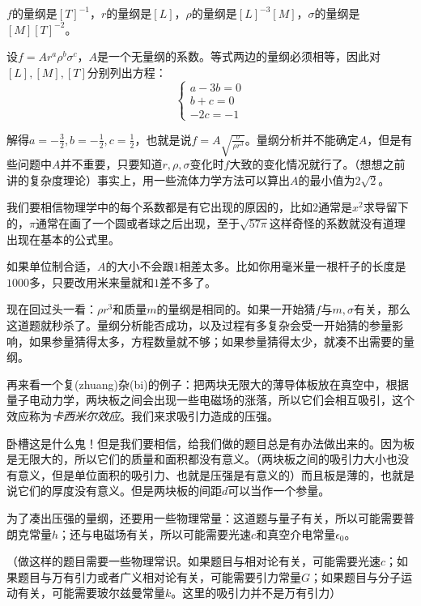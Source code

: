 $f$的量纲是$[T]^{-1}$，$r$的量纲是$[L]$，$\rho$的量纲是$[L]^{-3} [M]$，$\sigma$的量纲是$[M] [T]^{-2}$。

设$f=A r^a \rho^b \sigma^c$，$A$是一个无量纲的系数。等式两边的量纲必须相等，因此对$[L],[M],[T]$分别列出方程：
\begin{equation*}
\begin{cases}
a-3b=0 \\
b+c=0 \\
-2c=-1
\end{cases}
\end{equation*}

解得$a=-\frac{3}{2},b=-\frac{1}{2},c=\frac{1}{2}$，也就是说$f=A \sqrt{\frac{\sigma}{\rho r^3}}$。量纲分析并不能确定$A$，但是有些问题中$A$并不重要，只要知道$r,\rho,\sigma$变化时$f$大致的变化情况就行了。（想想之前讲的复杂度理论）事实上，用一些流体力学方法可以算出$A$的最小值为$2\sqrt{2}$。

我们要相信物理学中的每个系数都是有它出现的原因的，比如$2$通常是$x^2$求导留下的，$\pi$通常在画了一个圆或者球之后出现，至于$\sqrt{57 \pi}$这样奇怪的系数就没有道理出现在基本的公式里。

如果单位制合适，$A$的大小不会跟$1$相差太多。比如你用毫米量一根杆子的长度是$1000$多，只要改用米来量就和$1$差不多了。

现在回过头一看：$\rho r^3$和质量$m$的量纲是相同的。如果一开始猜$f$与$m,\sigma$有关，那么这道题就秒杀了。量纲分析能否成功，以及过程有多复杂会受一开始猜的参量影响，如果参量猜得太多，方程数量就不够；如果参量猜得太少，就凑不出需要的量纲。

再来看一个复(zhuang)杂(bi)的例子：把两块无限大的薄导体板放在真空中，根据量子电动力学，两块板之间会出现一些电磁场的涨落，所以它们会相互吸引，这个效应称为\emph{卡西米尔效应}。我们来求吸引力造成的压强。

卧槽这是什么鬼！但是我们要相信，给我们做的题目总是有办法做出来的。因为板是无限大的，所以它们的质量和面积都没有意义。（两块板之间的吸引力大小也没有意义，但是单位面积的吸引力、也就是压强是有意义的）而且板是薄的，也就是说它们的厚度没有意义。但是两块板的间距$d$可以当作一个参量。

为了凑出压强的量纲，还要用一些物理常量：这道题与量子有关，所以可能需要普朗克常量$h$；还与电磁场有关，所以可能需要光速$c$和真空介电常量$\epsilon_0$。

（做这样的题目需要一些物理常识。如果题目与相对论有关，可能需要光速$c$；如果题目与万有引力或者广义相对论有关，可能需要引力常量$G$；如果题目与分子运动有关，可能需要玻尔兹曼常量$k$。这里的吸引力并不是万有引力）

